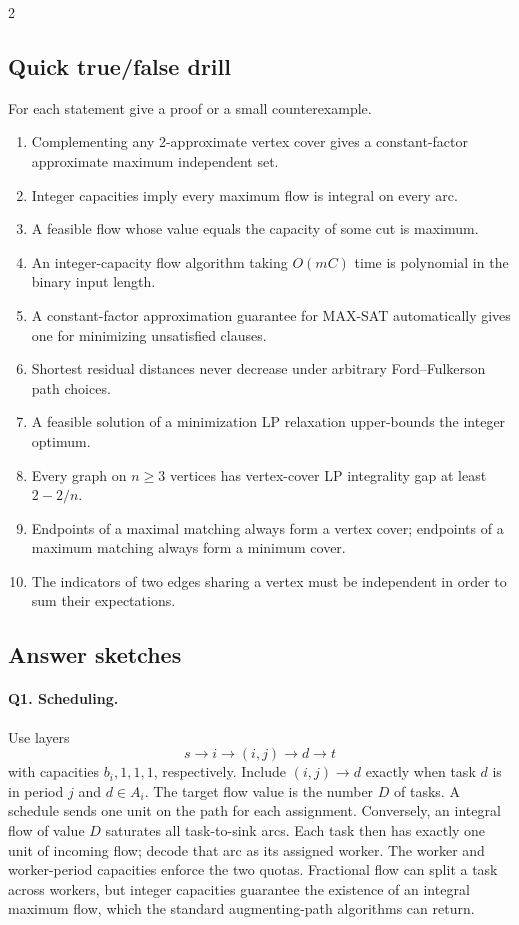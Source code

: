 \documentclass[8pt]{extarticle}
\theoremstyle{definition}
\begin{document}
\begin{multicols*}{2}
\subsection{Quick true/false drill}
For each statement give a proof or a small counterexample.
\begin{enumerate}[label=\textbf{T\arabic*.}]
  \item Complementing any 2-approximate vertex cover gives a constant-factor
        approximate maximum independent set.
  \item Integer capacities imply every maximum flow is integral on every arc.
  \item A feasible flow whose value equals the capacity of some cut is maximum.
  \item An integer-capacity flow algorithm taking $O(mC)$ time is polynomial
        in the binary input length.
  \item A constant-factor approximation guarantee for MAX-SAT automatically
        gives one for minimizing unsatisfied clauses.
  \item Shortest residual distances never decrease under arbitrary
        Ford--Fulkerson path choices.
  \item A feasible solution of a minimization LP relaxation upper-bounds
        the integer optimum.
  \item Every graph on $n\ge3$ vertices has vertex-cover LP integrality gap
        at least $2-2/n$.
  \item Endpoints of a maximal matching always form a vertex cover;
        endpoints of a maximum matching always form a minimum cover.
  \item The indicators of two edges sharing a vertex must be independent
        in order to sum their expectations.
\end{enumerate}

\clearpage
\subsection{Answer sketches}
\paragraph{Q1. Scheduling.}
Use layers
\[
s\longrightarrow i\longrightarrow(i,j)\longrightarrow d\longrightarrow t
\]
with capacities $b_i,1,1,1$, respectively.  Include $(i,j)\to d$ exactly
when task $d$ is in period $j$ and $d\in A_i$.  The target flow value is
the number $D$ of tasks.  A schedule sends one unit on the path for each
assignment.  Conversely, an integral flow of value $D$ saturates all
task-to-sink arcs.  Each task then has exactly one unit of incoming flow;
decode that arc as its assigned worker.  The worker and worker-period
capacities enforce the two quotas.  Fractional flow can split a task across
workers, but integer capacities guarantee the existence of an integral
maximum flow, which the standard augmenting-path algorithms can return.


\end{multicols*}
\end{document}

